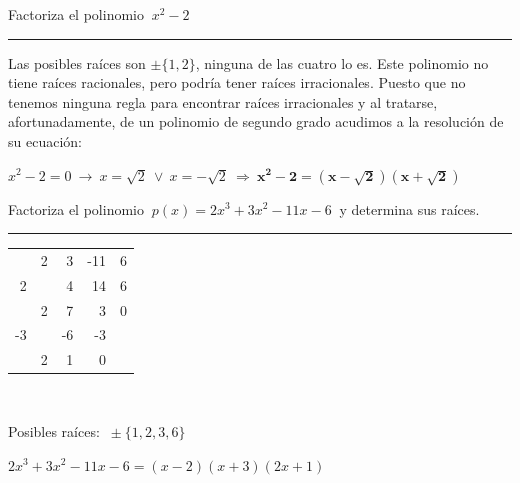 \begin{miejercicio}

Factoriza el polinomio $\ x^2-2$


\rule{250pt}{0.1pt}

Las posibles raíces son $\pm \{1,2\}$, ninguna de las cuatro lo es. Este polinomio no tiene raíces racionales, pero podría tener raíces irracionales. Puesto que no tenemos ninguna regla para encontrar raíces irracionales y al tratarse, afortunadamente, de un polinomio de segundo grado acudimos a la resolución de su ecuación:

\vspace{2mm} $x^2-2=0 \ \to \ x=\sqrt{2} \ \vee \ x=-\sqrt{2} \ \Rightarrow \  \boldsymbol{x^2-2=(x-\sqrt{2})(x+\sqrt{2})}$
	
\end{miejercicio}



\begin{miejercicio}

Factoriza el polinomio $\ p(x)=2x^3+3x^2-11x-6\ $ y determina sus raíces.

\rule{250pt}{0.1pt}

\begin{multicols}{2}
\begin{table}[H]
\centering
\begin{tabular}{r|rrrr}
 & 2 & 3 & -11 & 6 \\
2 &  & 4 & 14 & 6 \\ \hline
 & 2 & 7 & \multicolumn{1}{r|}{3} & 0 \\ \cline{5-5} 
-3 &  & -6 & -3 &  \\ \cline{1-4}
 & 2 & \multicolumn{1}{r|}{1} & 0 &  \\ \cline{4-4}
\end{tabular}
\end{table}	
$\quad$

Posibles raíces: $\ \pm\{1,2,3,6\}$

\vspace{4mm} $2x^3+3x^2-11x-6=(x-2)(x+3)(2x+1)$
\end{multicols}

	
\end{miejercicio}




\vspace{5mm} %

